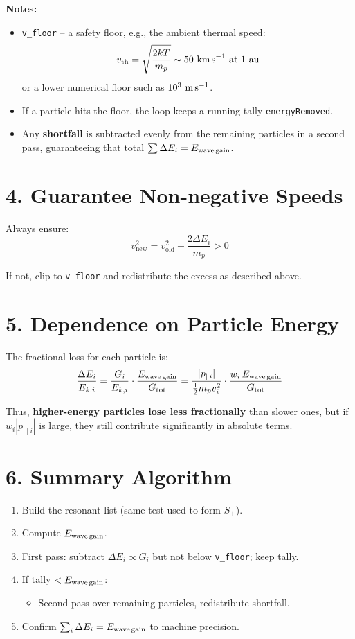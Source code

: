 \textbf{Notes:}
\begin{itemize}
    \item \texttt{v\_floor} – a safety floor, e.g., the ambient thermal speed:
    \[
    v_{\text{th}} = \sqrt{\frac{2kT}{m_p}} \sim 50~\text{km\,s}^{-1} \text{ at 1 au}
    \]
    or a lower numerical floor such as $10^3~\text{m\,s}^{-1}$.
    \item If a particle hits the floor, the loop keeps a running tally \texttt{energyRemoved}.
    \item Any \textbf{shortfall} is subtracted evenly from the remaining particles in a second pass, guaranteeing that total $\sum \Delta E_i = E_{\text{wave\,gain}}$.
\end{itemize}

\section*{4. Guarantee Non-negative Speeds}

Always ensure:
\[
v_{\text{new}}^2 = v_{\text{old}}^2 - \frac{2\Delta E_i}{m_p} > 0
\]

If not, clip to \texttt{v\_floor} and redistribute the excess as described above.

\section*{5. Dependence on Particle Energy}

The fractional loss for each particle is:
\[
\frac{\Delta E_i}{E_{k,i}} =
\frac{G_i}{E_{k,i}} \cdot \frac{E_{\text{wave\,gain}}}{G_{\text{tot}}}
= \frac{|p_{\parallel i}|}{\tfrac{1}{2} m_p v_i^2}
\cdot \frac{w_i\,E_{\text{wave\,gain}}}{G_{\text{tot}}}
\]

Thus, \textbf{higher-energy particles lose less fractionally} than slower ones,  
but if $w_i |p_{\parallel i}|$ is large, they still contribute significantly in absolute terms.

\section*{6. Summary Algorithm}

\begin{enumerate}
    \item Build the resonant list (same test used to form $S_\pm$).
    \item Compute $E_{\text{wave\,gain}}$.
    \item First pass: subtract $\Delta E_i \propto G_i$ but not below \texttt{v\_floor}; keep tally.
    \item If tally $< E_{\text{wave\,gain}}$:
        \begin{itemize}
            \item Second pass over remaining particles, redistribute shortfall.
        \end{itemize}
    \item Confirm $\sum_i \Delta E_i = E_{\text{wave\,gain}}$ to machine precision.
\end{enumerate}

